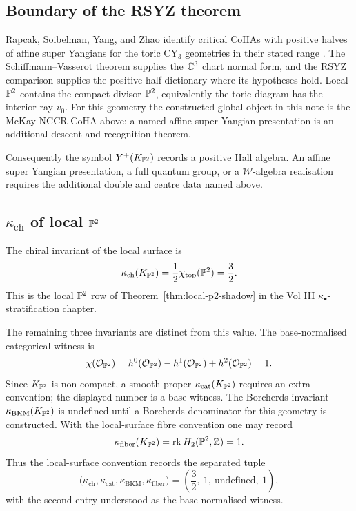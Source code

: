 \subsection*{Boundary of the RSYZ theorem}

Rapcak, Soibelman, Yang, and Zhao identify critical CoHAs with positive
halves of affine super Yangians for the toric CY$_3$ geometries in their
stated range \cite{RSYZ2020}. The Schiffmann--Vasserot theorem supplies
the $\C^3$ chart normal form, and the RSYZ comparison supplies the
positive-half dictionary where its hypotheses hold. Local $\P^2$
contains the compact divisor $\P^2$, equivalently the toric diagram has
the interior ray $v_0$. For this geometry the constructed global object
in this note is the McKay NCCR CoHA above; a named affine super Yangian
presentation is an additional descent-and-recognition theorem.

Consequently the symbol $Y^+(K_{\P^2})$ records a positive Hall algebra.
An affine super Yangian presentation, a full quantum group, or a
$\mathcal{W}$-algebra realisation requires the additional double and
centre data named above.

\subsection*{\texorpdfstring{$\kappa_{\mathrm{ch}}$}{kch} of local
\texorpdfstring{$\P^2$}{P2}}

The chiral invariant of the local surface is
\[
 \kappa_{\mathrm{ch}}(K_{\P^2})
 =\frac{1}{2}\chi_{\mathrm{top}}(\P^2)
 =\frac{3}{2}.
\]
This is the local $\P^2$ row of
Theorem~\ref{thm:local-p2-shadow} in the Vol III
\(\kappa_\bullet\)-stratification chapter.

The remaining three invariants are distinct from this value. The
base-normalised categorical witness is
\[
 \chi(\cO_{\P^2})=h^0(\cO_{\P^2})-h^1(\cO_{\P^2})+h^2(\cO_{\P^2})
 =1.
\]
Since $K_{\P^2}$ is non-compact, a smooth-proper
$\kappa_{\mathrm{cat}}(K_{\P^2})$ requires an extra convention; the
displayed number is a base witness. The Borcherds invariant
$\kappa_{\mathrm{BKM}}(K_{\P^2})$ is undefined until a Borcherds
denominator for this geometry is constructed. With the local-surface
fibre convention one may record
\[
 \kappa_{\mathrm{fiber}}(K_{\P^2})=\mathrm{rk}\,H_2(\P^2,\Z)=1.
\]
Thus the local-surface convention records the separated tuple
\[
 \bigl(\kappa_{\mathrm{ch}},\kappa_{\mathrm{cat}},
 \kappa_{\mathrm{BKM}},\kappa_{\mathrm{fiber}}\bigr)
 =
 \left(\frac32,\ 1,\ \text{undefined},\ 1\right),
\]
with the second entry understood as the base-normalised witness.

